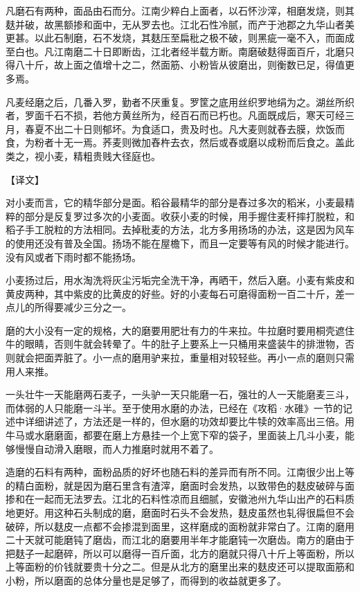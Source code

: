 \documentclass[12pt,UTF8]{ctexbook}
\begin{document}
凡磨石有两种，面品由石而分。江南少粹白上面者，以石怀沙滓，相磨发烧，则其麸并破，故黑额掺和面中，无从罗去也。江北石性冷腻，而产于池郡之九华山者美更甚。以此石制磨，石不发烧，其麸压至扁秕之极不破，则黑疵一毫不入，而面成至白也。凡江南磨二十日即断齿，江北者经半载方断。南磨破麸得面百斤，北磨只得八十斤，故上面之值增十之二，然面筋、小粉皆从彼磨出，则衡数已足，得值更多焉。

凡麦经磨之后，几番入罗，勤者不厌重复。罗筐之底用丝织罗地绢为之。湖丝所织者，罗面千石不损，若他方黄丝所为，经百石而已朽也。凡面既成后，寒天可经三月，春夏不出二十日则郁坏。为食适口，贵及时也。凡大麦则就舂去膜，炊饭而食，为粉者十无一焉。荞麦则微加舂杵去衣，然后或舂或磨以成粉而后食之。盖此类之，视小麦，精粗贵贱大径庭也。

【译文】

对小麦而言，它的精华部分是面。稻谷最精华的部分是舂过多次的稻米，小麦最精粹的部分是反复罗过多次的小麦面。收获小麦的时候，用手握住麦秆摔打脱粒，和稻子手工脱粒的方法相同。去掉秕麦的方法，北方多用扬场的办法，这是因为风车的使用还没有普及全国。扬场不能在屋檐下，而且一定要等有风的时候才能进行。没有风或者下雨时都不能扬场。

小麦扬过后，用水淘洗将灰尘污垢完全洗干净，再晒干，然后入磨。小麦有紫皮和黄皮两种，其中紫皮的比黄皮的好些。好的小麦每石可磨得面粉一百二十斤，差一点儿的所得要减少三分之一。

磨的大小没有一定的规格，大的磨要用肥壮有力的牛来拉。牛拉磨时要用桐壳遮住牛的眼睛，否则牛就会转晕了。牛的肚子上要系上一只桶用来盛装牛的排泄物，否则就会把面弄脏了。小一点的磨用驴来拉，重量相对较轻些。再小一点的磨则只需用人来推。

一头壮牛一天能磨两石麦子，一头驴一天只能磨一石，强壮的人一天能磨麦三斗，而体弱的人只能磨一斗半。至于使用水磨的办法，已经在《攻稻·水碓》一节的记述中详细讲述了，方法还是一样的，但水磨的功效却要比牛犊的效率高出三倍。用牛马或水磨磨面，都要在磨上方悬挂一个上宽下窄的袋子，里面装上几斗小麦，能够慢慢自动滑入磨眼，而人力推磨时就用不着了。

造磨的石料有两种，面粉品质的好坏也随石料的差异而有所不同。江南很少出上等的精白面粉，就是因为磨石里含有渣滓，磨面时会发热，以致带色的麸皮破碎与面掺和在一起而无法罗去。江北的石料性凉而且细腻，安徽池州九华山出产的石料质地更好。用这种石头制成的磨，磨面时石头不会发热，麸皮虽然也轧得很扁但不会破碎，所以麸皮一点都不会掺混到面里，这样磨成的面粉就非常白了。江南的磨用二十天就可能磨钝了磨齿，而江北的磨要用半年才能磨钝一次磨齿。南方的磨由于把麸子一起磨碎，所以可以磨得一百斤面，北方的磨就只得八十斤上等面粉，所以上等面粉的价钱就要贵十分之二。但是从北方的磨里出来的麸皮还可以提取面筋和小粉，所以磨面的总体分量也是足够了，而得到的收益就更多了。
\end{document}
